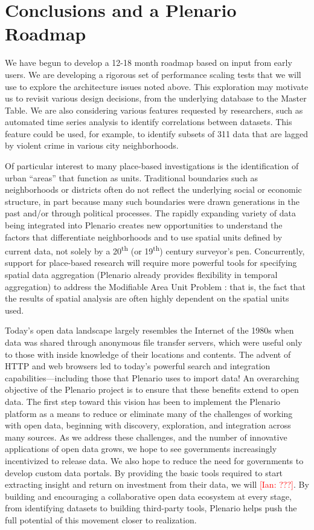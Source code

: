\documentclass[11pt]{article}
\newcommand{\ian}[1]{\textcolor{Red}{[Ian: #1]}}
\newcommand{\ian}[1]{}
\begin{document}
\section{Conclusions and a Plenario Roadmap}
We have begun to develop a 12-18 month roadmap based on input from early users. We are developing a rigorous set of performance scaling tests that we will use to explore the architecture issues noted above. This exploration may motivate us to revisit various design decisions, from the underlying database to the Master Table. We are also considering various features requested by researchers, such as automated time series analysis to identify correlations between datasets. This feature could be used, for example, to identify subsets of 311 data that are lagged by violent crime in various city neighborhoods. 

Of particular interest to many place-based investigations is the identification of urban ``areas'' that function as units. Traditional boundaries such as neighborhoods or districts often do not reflect the underlying social or economic structure, in part because many such boundaries were drawn generations in the past and/or through political processes. The rapidly expanding variety of data being integrated into Plenario creates new opportunities to understand the factors that differentiate neighborhoods and to use spatial units defined by current data, not solely by a 20\textsuperscript{th} (or 19\textsuperscript{th}) century surveyor's pen. Concurrently, support for place-based research will require more powerful tools for specifying spatial data aggregation (Plenario already provides flexibility in temporal aggregation) to address the Modifiable Area Unit Problem \cite{wong_2009}: that is, the fact that the results of spatial analysis are often highly dependent on the spatial units used.

Today's open data landscape largely resembles the Internet of the 1980s when data was shared through anonymous file transfer servers, which were useful only to those with inside knowledge of their locations and contents. The advent of HTTP and web browsers led to today's powerful search and integration capabilities---including those that Plenario uses to import data! An overarching objective of the Plenario project is to ensure that these benefits extend to open data.
The first step toward this vision has been to implement the Plenario platform as a means to reduce or eliminate many of the challenges of working with open data, beginning with discovery, exploration, and integration across many sources. As we address these challenges, and the number of innovative applications of open data grows, we hope to see governments increasingly incentivized to release data. We also hope to reduce the need for governments to develop custom data portals. By providing the basic tools required to start extracting insight and return on investment from their data, we will \ian{???}. By building and encouraging a collaborative open data ecosystem at every stage, from identifying datasets to building third-party tools, Plenario helps push the full potential of this movement closer to realization. 
\end{document}
